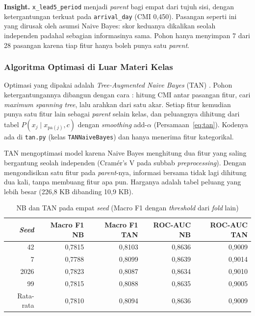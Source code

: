 {\small
\textbf{Insight.} \texttt{x\_lead5\_period} menjadi \textit{parent} bagi empat dari tujuh sisi, dengan ketergantungan terkuat pada \texttt{arrival\_day} (CMI 0,450). Pasangan seperti ini yang dirusak oleh asumsi Naive Bayes: skor keduanya dikalikan seolah independen padahal sebagian informasinya sama. Pohon hanya menyimpan 7 dari 28 pasangan karena tiap fitur hanya boleh punya satu \textit{parent}.\par}

\subsubsection{Algoritma Optimasi di Luar Materi Kelas}
Optimasi yang dipakai adalah \textit{Tree-Augmented Naive Bayes} (TAN) \cite{friedman1997bayesian}. Pohon ketergantungannya dibangun dengan cara \cite{chow1968dependence}: hitung CMI antar pasangan fitur, cari \textit{maximum spanning tree}, lalu arahkan dari satu akar. Setiap fitur kemudian punya satu fitur lain sebagai \textit{parent} selain kelas, dan peluangnya dihitung dari tabel $P(x_j \mid x_{\mathrm{pa}(j)}, c)$ dengan \textit{smoothing} add-$\alpha$ (Persamaan~\ref{eq:tan}). Kodenya ada di \texttt{tan.py} (kelas \texttt{TANNaiveBayes}) dan hanya menerima fitur kategorikal.

TAN mengoptimasi model karena Naive Bayes menghitung dua fitur yang saling bergantung seolah independen (Cram\'er's V pada subbab \textit{preprocessing}). Dengan mengondisikan satu fitur pada \textit{parent}-nya, informasi bersama tidak lagi dihitung dua kali, tanpa membuang fitur apa pun. Harganya adalah tabel peluang yang lebih besar (226,8 KB dibanding 10,9 KB).

\begin{table}[H]
	\centering
	\caption{NB dan TAN pada empat \textit{seed} (Macro F1 dengan \textit{threshold} dari \textit{fold} lain)}
	\label{tab:nb-tan-seed}
	\begin{tabular}{r r r r r}
		\toprule
		\textbf{\textit{Seed}} & \textbf{Macro F1 NB} & \textbf{Macro F1 TAN} & \textbf{ROC-AUC NB} & \textbf{ROC-AUC TAN} \\
		\midrule
		42 & 0,7815 & 0,8103 & 0,8636 & 0,9009 \\
		7 & 0,7788 & 0,8099 & 0,8639 & 0,9014 \\
		2026 & 0,7823 & 0,8087 & 0,8634 & 0,9010 \\
		99 & 0,7815 & 0,8088 & 0,8635 & 0,9005 \\
		\midrule
		Rata-rata & 0,7810 & 0,8094 & 0,8636 & 0,9009 \\
		\bottomrule
	\end{tabular}
\end{table}


